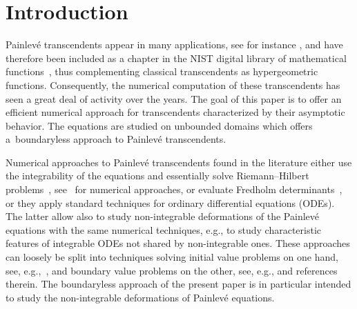 \documentclass[pdftex]{sigma}
\begin{document}
\section{Introduction}
Painlev\'e transcendents appear in many applications, see for instance \cite{Cla}, and have therefore been included as a chapter in the NIST digital library of mathematical functions~\cite{NIST}, thus complementing classical transcendents as hypergeometric functions. Consequently, the nume\-ri\-cal computation of these transcendents has seen a great deal of activity over the years. The goal of this paper is to offer an efficient numerical approach for transcendents characterized by their asymptotic behavior. The equations are studied on unbounded domains which offers a~boundaryless approach to Painlev\'e transcendents.

Numerical approaches to Painlev\'e transcendents found in the literature either use the integrability of the equations and essentially solve Riemann--Hilbert problems~\cite{FIKN}, see~\cite{olver} for numerical approaches, or evaluate Fredholm determinants~\cite{fredholm2,fredholm}, or they apply standard techniques for ordinary differential equations (ODEs). The latter allow also to study non-integrable deformations of the Painlev\'e equations with the same numerical techniques, e.g., to study cha\-rac\-teristic features of integrable ODEs not shared by non-integrable ones. These approaches can loosely be split into techniques solving initial value problems on one hand, see, e.g.,~\cite{JK}, and boundary value problems on the other, see, e.g., \cite{chebop,DubrovinGravaKlein,FW} and references therein. The boundaryless approach of the present paper is in particular intended to study the non-integrable deformations of Painlev\'e equations.
\end{document}
